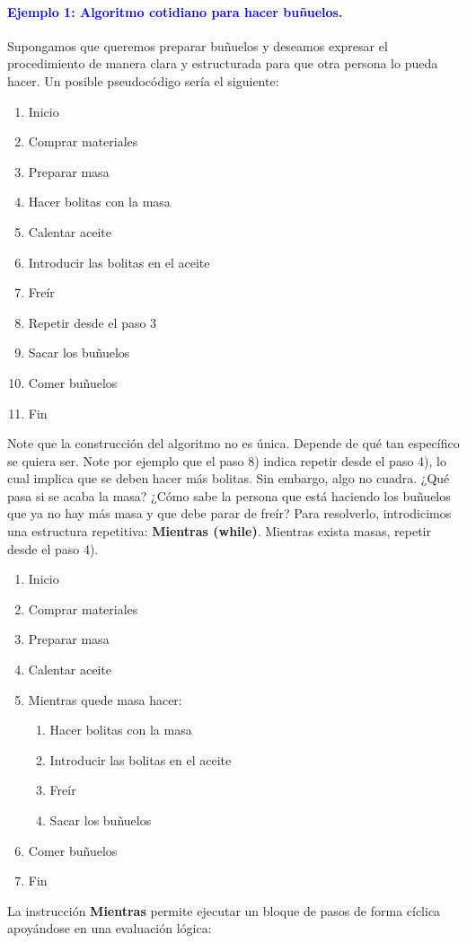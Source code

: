 \documentclass[12pt]{article}
\begin{document}
\paragraph{\textcolor{blue}{Ejemplo 1: Algoritmo cotidiano para hacer buñuelos.}}
Supongamos que queremos preparar buñuelos y deseamos expresar el procedimiento de 
manera clara y estructurada para que otra persona lo pueda hacer. Un posible 
pseudocódigo sería el siguiente:
%
\begin{center}
\begin{enumerate}[label=\arabic*.]
    \item Inicio
    \item Comprar materiales
    \item Preparar masa
    \item Hacer bolitas con la masa
    \item Calentar aceite
    \item Introducir las bolitas en el aceite
    \item Freír
    \item Repetir desde el paso 3
    \item Sacar los buñuelos
    \item Comer buñuelos
    \item Fin
\end{enumerate}
\end{center}
%
Note que la construcción del algoritmo no es única. Depende de qué tan específico 
se quiera ser. Note por ejemplo que el paso 8) indica repetir desde el paso 4), 
lo cual implica que se deben hacer más bolitas. Sin embargo, algo no cuadra. ¿Qué pasa 
si se acaba la masa? 
¿Cómo sabe la persona que está haciendo los buñuelos que ya no hay más masa y que 
debe parar de freír? 
Para resolverlo, introdicimos una estructura repetitiva: \textbf{Mientras (while)}. 
Mientras exista masas, repetir desde el paso 4). 
\begin{enumerate}[label=\arabic*.]
    \item Inicio
    \item Comprar materiales
    \item Preparar masa
    \item Calentar aceite
    \item Mientras quede masa hacer:
    \begin{enumerate}[label=\alph*)]
        \item  Hacer bolitas con la masa
        \item Introducir las bolitas en el aceite
        \item Freír
        \item Sacar los buñuelos
    \end{enumerate}
    \item Comer buñuelos
    \item Fin
\end{enumerate}
%
La instrucción \textbf{Mientras} permite ejecutar un bloque de pasos de 
forma cíclica apoyándose en una evaluación lógica:
\end{document}
